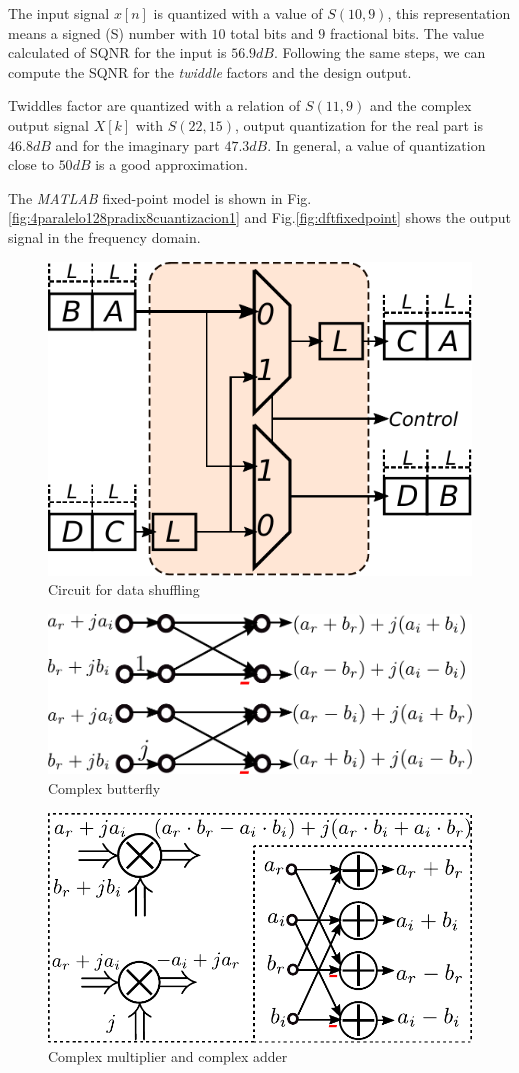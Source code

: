 \documentclass[journal,comsoc]{IEEEtran}
\begin{document}
The input signal $x[n]$ is quantized with a value of $S(10,9)$, this representation means a signed (S) number with $10$ total bits and $9$ fractional bits. The value calculated of SQNR for the input is $56.9dB$. Following the same steps, we can compute the SQNR for the \textit{twiddle} factors and the design output.

Twiddles factor are quantized with a relation of $S(11,9)$ and the complex output signal $X[k]$ with $S(22,15)$, output quantization for the real part is $46.8dB$ and for the imaginary part $47.3dB$. In general, a value of quantization close to $50dB$ is a good approximation.


The \textit{MATLAB} fixed-point model is shown in Fig. \ref{fig:4paralelo128pradix8cuantizacion1} and  Fig.\ref{fig:dftfixedpoint} shows the output signal in the frequency domain.

\begin{figure}[ht!] 
	\centering
	\includegraphics[width=0.42\linewidth]{Diagramas/miSeccionFiguras/Shift.pdf}
	\caption{Circuit for data shuffling}
	\label{fig:shift}
\end{figure}
\begin{figure}[ht!] 
	\centering
	\includegraphics[width=0.65\linewidth]{Diagramas/miSeccionFiguras/ButterComplejo.pdf}
	\caption{Complex butterfly }
	\label{fig:buttercomplejo}
\end{figure}
\begin{figure}[ht!] 
	\centering
	\includegraphics[width=0.65\linewidth]{Diagramas/miSeccionFiguras/SumMult.pdf}
	\caption{Complex multiplier and complex adder}
	\label{fig:summult}
\end{figure}
\end{document}
